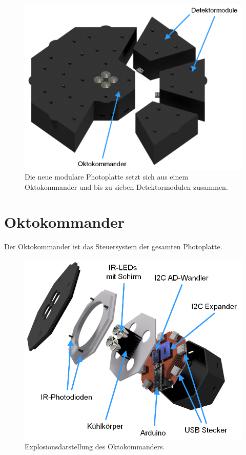 \documentclass{sciposter}
\begin{document}
\begin{multicols}{3}
\begin{figure}[h]
	\centering
	\includegraphics[scale=1.2]{../CAD_Bilder/Gestikulaser/Gestikulaser_beschriftet.png}
	\caption{Die neue modulare Photoplatte setzt sich aus einem Oktokommander und bis zu sieben Detektormodulen zusammen.}
	\label{fig:PhotoplatteAlpha}
\end{figure}


\section{Oktokommander}
\noindent
Der Oktokommander ist das Steuersystem der gesamten Photoplatte.

\begin{figure}[h]
	\centering
	\includegraphics[scale=1.2]{../CAD_Bilder/Oktokommander/Oktokommander_beschriftet.png}
	\caption{Explosionsdarstellung des Oktokommanders.}
	\label{fig:Oktokommander}
\end{figure}


\end{multicols}
\end{document}
